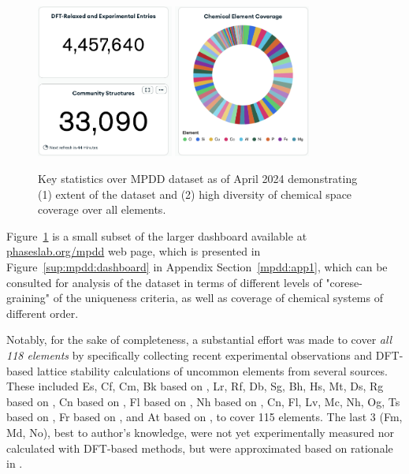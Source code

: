 \begin{figure}[H]
    \centering
    \includegraphics[width=0.4\textwidth]{mpdd/Screenshot 2024-05-05 at 11.54.32.png}
    \includegraphics[width=0.4\textwidth]{mpdd/Screenshot 2024-05-05 at 11.54.47.png}
    \caption{Key statistics over MPDD dataset as of April 2024 demonstrating (1) extent of the dataset and (2) high diversity of chemical space coverage over all elements.}
    \label{mpdd:fig:dataset}
\end{figure}

 Figure~\ref{mpdd:fig:dataset} is a small subset of the larger dashboard available at \href{https://phaseslab.org/mpdd}{phaseslab.org/mpdd} web page, which is presented in Figure~\ref{sup:mpdd:dashboard} in Appendix Section~\ref{mpdd:app1}, which can be consulted for analysis of the dataset in terms of different levels of "corese-graining" of the uniqueness criteria, as well as coverage of chemical systems of different order.

Notably, for the sake of completeness, a substantial effort was made to cover \emph{all 118 elements} by specifically collecting recent experimental observations and DFT-based lattice stability calculations of uncommon elements from several sources. These included
Es, Cf, Cm, Bk based on \citet{2006TheElements}, Lr, Rf, Db, Sg, Bh, Hs, Mt, Ds, Rg based on \citet{Gyanchandani2011PhysicalMetals}, Cn based on \citet{Atta-Fynn2015DensityElements}, Fl based on \citet{MaizHadjAhmed2017RevisitingFlerovium}, Nh based on \citet{Atarah2020FirstNihonium}, Cn, Fl, Lv, Mc, Nh, Og, Ts based on \citet{Trombach2019ExploringTheory}, Fr based on \citet{Koufos2013ElectronicFrancium}, and At based on \citet{Hermann2013CondensedMetallic}, to cover 115 elements. The last 3 (Fm, Md, No), best to author's knowledge, were not yet experimentally measured nor calculated with DFT-based methods, but were approximated based on rationale in \citet{2006TheElements}.


